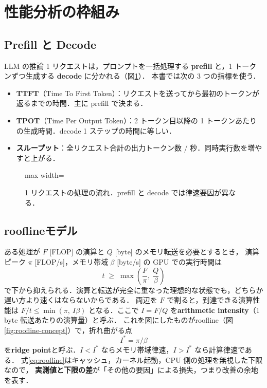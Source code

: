 \documentclass[a4paper,10pt]{ltjsarticle}
\begin{document}
\section{性能分析の枠組み}
\label{sec:framework}

\subsection{Prefill と Decode}
LLM の推論 1 リクエストは，プロンプトを一括処理する \textbf{prefill} と，1 トークンずつ生成する \textbf{decode} に分かれる（図\ref{fig:pd}）\cite{kotoba}．
本書では次の 3 つの指標を使う．
\begin{itemize}
\item \textbf{TTFT}（Time To First Token）：リクエストを送ってから最初のトークンが返るまでの時間．主に prefill で決まる．
\item \textbf{TPOT}（Time Per Output Token）：2 トークン目以降の 1 トークンあたりの生成時間．decode 1 ステップの時間に等しい．
\item \textbf{スループット}：全リクエスト合計の出力トークン数 / 秒．同時実行数を増やすと上がる．
\end{itemize}

\begin{figure}[htbp]\centering
\begin{adjustbox}{max width=\linewidth}\end{adjustbox}
\caption{1 リクエストの処理の流れ．prefill と decode では律速要因が異なる．}
\label{fig:pd}
\end{figure}

\subsection{rooflineモデル}
\label{sec:roofline}
ある処理が $F$ [FLOP] の演算と $Q$ [byte] のメモリ転送を必要とするとき，
演算ピーク $\pi$ [FLOP/s]，メモリ帯域 $\beta$ [byte/s] の GPU での実行時間は
\begin{equation}
t \;\ge\; \max\!\left(\frac{F}{\pi},\ \frac{Q}{\beta}\right)
\label{eq:roofline}
\end{equation}
で下から抑えられる．演算と転送が完全に重なった理想的な状態でも，どちらか遅い方より速くはならないからである．
両辺を $F$ で割ると，到達できる演算性能は $F/t \le \min(\pi,\ I\beta)$ となる．ここで $I = F/Q$ を\textbf{arithmetic intensity}（1 byte 転送あたりの演算量）と呼ぶ．
これを図にしたものがroofline（図\ref{fig:roofline-concept}）で，折れ曲がる点
\begin{equation}
I^\ast = \pi / \beta
\end{equation}
を\textbf{ridge point}と呼ぶ．$I < I^\ast$ ならメモリ帯域律速，$I > I^\ast$ なら計算律速である．
式\eqref{eq:roofline}はキャッシュ，カーネル起動，CPU 側の処理を無視した下限なので，
\textbf{実測値と下限の差}が「その他の要因」による損失，つまり改善の余地を表す．
\end{document}
